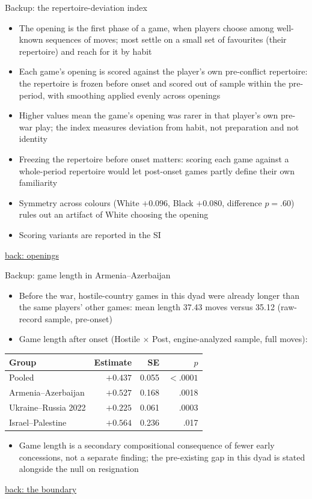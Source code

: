 \documentclass[aspectratio=169,11pt,t]{beamer}
\newcommand{\backto}[2]{\vfill\hfill\hyperlink{#1}{\textcolor{linkblue}{\scriptsize\textsf{back: #2}}}}
\begin{document}
\begin{frame}[label=bk-openings]{Backup: the repertoire-deviation index}
  \begin{itemize}
    \item The opening is the first phase of a game, when players choose among well-known sequences of moves; most settle on a small set of favourites (their repertoire) and reach for it by habit
    \item Each game's opening is scored against the player's own pre-conflict repertoire: the repertoire is frozen before onset and scored out of sample within the pre-period, with smoothing applied evenly across openings
    \item Higher values mean the game's opening was rarer in that player's own pre-war play; the index measures deviation from habit, not preparation and not identity
    \item Freezing the repertoire before onset matters: scoring each game against a whole-period repertoire would let post-onset games partly define their own familiarity
    \item Symmetry across colours (White $+0.096$, Black $+0.080$, difference $p = .60$) rules out an artifact of White choosing the opening
    \item Scoring variants are reported in the SI
  \end{itemize}
  \backto{openings}{openings}
\end{frame}

\begin{frame}[label=bk-aalength]{Backup: game length in Armenia--Azerbaijan}
  \small
  \begin{itemize}
    \item Before the war, hostile-country games in this dyad were already longer than the same players' other games: mean length 37.43 moves versus 35.12 (raw-record sample, pre-onset)
    \item Game length after onset (Hostile $\times$ Post, engine-analyzed sample, full moves):
  \end{itemize}
  \centering
  \begin{tabular}{@{}lrrr@{}}
    \toprule
    Group & Estimate & SE & $p$ \\
    \midrule
    Pooled & $+0.437$ & 0.055 & $< .0001$ \\
    Armenia--Azerbaijan & $+0.527$ & 0.168 & .0018 \\
    Ukraine--Russia 2022 & $+0.225$ & 0.061 & .0003 \\
    Israel--Palestine & $+0.564$ & 0.236 & .017 \\
    \bottomrule
  \end{tabular}
  \begin{flushleft}
    \begin{itemize}
      \item Game length is a secondary compositional consequence of fewer early concessions, not a separate finding; the pre-existing gap in this dyad is stated alongside the null on resignation
    \end{itemize}
  \end{flushleft}
  \backto{boundary}{the boundary}
\end{frame}
\end{document}
